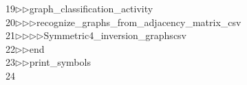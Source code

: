 \begin{tabbing}
19\>$\triangleright$\>$\triangleright$\>graph\_classification\_activity\ \\[0pt]
20\>$\triangleright$\>$\triangleright$\>$\triangleright$\>recognize\_graphs\_from\_adjacency\_matrix\_csv\ \\[0pt]
21\>$\triangleright$\>$\triangleright$\>$\triangleright$\>$\triangleright$\>Symmetric4\_inversion\_graphscsv\ \\[0pt]
22\>$\triangleright$\>$\triangleright$\>end\ \\[0pt]
23\>$\triangleright$\>$\triangleright$\>print\_symbols\\[0pt]
24\>\end{tabbing}
